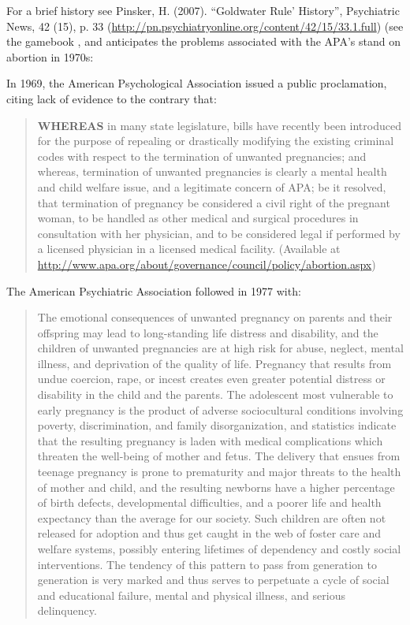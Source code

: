 \begin{refsection}
{For a brief history see Pinsker, H. (2007). “Goldwater Rule' History”, Psychiatric News, 42 (15), p. 33 (\url{http://pn.psychiatryonline.org/content/42/15/33.1.full})} (see the gamebook , and anticipates the problems associated with the APA’s stand on abortion in 1970s:

In 1969, the American Psychological Association issued a public proclamation, citing lack of evidence to the contrary that:

\begin{quote}

\textbf{WHEREAS} in many state legislature, bills have recently been introduced for the purpose of repealing or drastically modifying the existing criminal codes with respect to the termination of unwanted pregnancies; and whereas, termination of unwanted pregnancies is clearly a mental health and child welfare issue, and a legitimate concern of APA; be it resolved, that termination of pregnancy be considered a civil right of the pregnant woman, to be handled as other medical and surgical procedures in consultation with her physician, and to be considered legal if performed by a licensed physician in a licensed medical facility.⁠ (Available at \url{http://www.apa.org/about/governance/council/policy/abortion.aspx})
\end{quote}

The American Psychiatric Association followed in 1977 with:

\begin{quote}

The emotional consequences of unwanted pregnancy on parents and their offspring may lead to long-standing life distress and disability, and the children of unwanted pregnancies are at high risk for abuse, neglect, mental illness, and deprivation of the quality of life. Pregnancy that results from undue coercion, rape, or incest creates even greater potential distress or disability in the child and the parents. The adolescent most vulnerable to early pregnancy is the product of adverse sociocultural conditions involving poverty, discrimination, and family disorganization, and statistics indicate that the resulting pregnancy is laden with medical complications which threaten the well-being of mother and fetus. The delivery that ensues from teenage pregnancy is prone to prematurity and major threats to the health of mother and child, and the resulting newborns have a higher percentage of birth defects, developmental difficulties, and a poorer life and health expectancy than the average for our society. Such children are often not released for adoption and thus get caught in the web of foster care and welfare systems, possibly entering lifetimes of dependency and costly social interventions. The tendency of this pattern to pass from generation to generation is very marked and thus serves to perpetuate a cycle of social and educational failure, mental and physical illness, and serious delinquency.


\end{quote}
\end{refsection}
